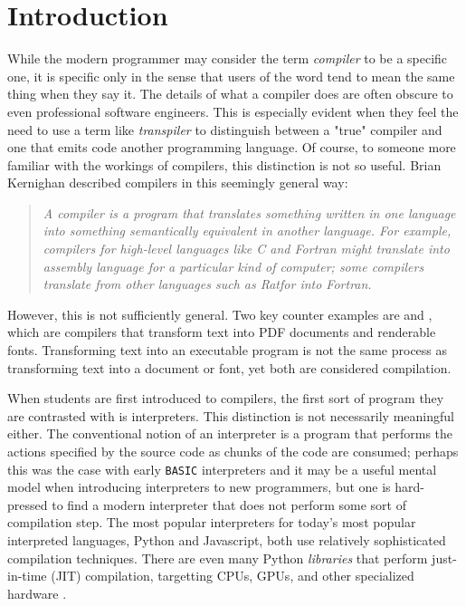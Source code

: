 \chapter{Introduction}

While the modern programmer may consider the term \emph{compiler} to be a specific one, it is specific only in the
sense that users of the word tend to mean the same thing when they say it.
The details of what a compiler does are often obscure to even professional software engineers.
This is especially evident when they feel the need to use a term like \emph{transpiler} to distinguish between a
"true" compiler and one that emits code another programming language.
Of course, to someone more familiar with the workings of compilers, this distinction is not so useful.
Brian Kernighan described compilers in this seemingly general way\cite{new_history_of_modern_computing}:

\begin{quotation}
\textit{
A compiler is a program that translates something written in one language into something semantically equivalent in another language.
For example, compilers for high-level languages like C and Fortran might translate into assembly language for a particular kind of computer; some compilers translate from other languages such as Ratfor into Fortran.
}
\end{quotation}

However, this is not sufficiently general.
Two key counter examples are \tex and \metafont, which are compilers that
transform text into PDF documents and renderable fonts.
Transforming text into an executable program is not the same process as
transforming text into a document or font, yet both are considered compilation.

When students are first introduced to compilers, the first sort of program they are contrasted with is interpreters.
This distinction is not necessarily meaningful either.
The conventional notion of an interpreter is a program that performs the actions
specified by the source code as chunks of the code are consumed;
perhaps this was the case with early \texttt{BASIC} interpreters
and it may be a useful mental model when introducing interpreters to new programmers,
but one is hard-pressed to find a modern interpreter that does not perform some sort of compilation step.
The most popular interpreters for today's most popular interpreted languages,
Python and Javascript, both use relatively sophisticated compilation techniques.
There are even many Python \textit{libraries} that perform
just-in-time (JIT) compilation, targetting CPUs, GPUs, and other specialized hardware
\cite{jax-compiler}\cite{lam_numba}\cite{numba_cuda}\cite{triton_tillet}.

